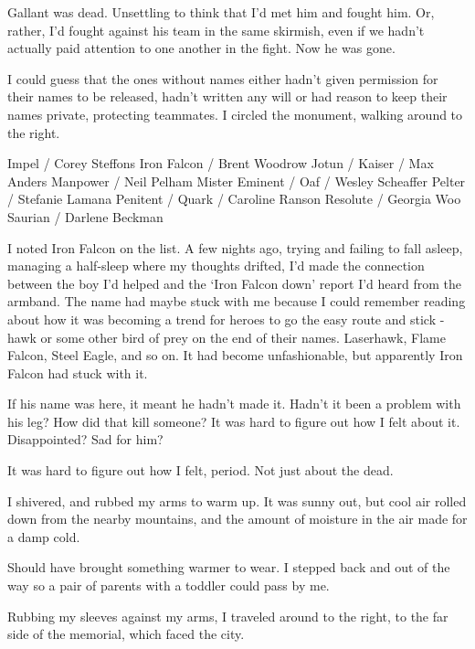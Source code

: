 Gallant was dead. Unsettling to think that I'd met him and fought him.   Or, rather, I'd fought against his team in the same skirmish, even if we hadn't actually paid attention to one another in the fight.  Now he was gone.



I could guess that the ones without names either hadn't given permission for their names to be released, hadn't written any will or had reason to keep their names private, protecting teammates.  I circled the monument, walking around to the right.



Impel / Corey Steffons
Iron Falcon / Brent Woodrow
Jotun /
Kaiser / Max Anders
Manpower / Neil Pelham
Mister Eminent /
Oaf / Wesley Scheaffer
Pelter / Stefanie Lamana
Penitent /
Quark / Caroline Ranson
Resolute / Georgia Woo
Saurian / Darlene Beckman



I noted Iron Falcon on the list.  A few nights ago, trying and failing to fall asleep, managing a half-sleep where my thoughts drifted, I'd made the connection between the boy I'd helped and the `Iron Falcon down' report I'd heard from the armband.  The name had maybe stuck with me because I could remember reading about how it was becoming a trend for heroes to go the easy route and stick -hawk or some other bird of prey on the end of their names.  Laserhawk, Flame Falcon, Steel Eagle, and so on.  It had become unfashionable, but apparently Iron Falcon had stuck with it.



If his name was here, it meant he hadn't made it.  Hadn't it been a problem with his leg?  How did that kill someone?  It was hard to figure out how I felt about it.  Disappointed?  Sad for him?



It was hard to figure out how I felt, period.  Not just about the dead.



I shivered, and rubbed my arms to warm up.  It was sunny out, but cool air rolled down from the nearby mountains, and the amount of moisture in the air made for a damp cold.



Should have brought something warmer to wear.  I stepped back and out of the way so a pair of parents with a toddler could pass by me.



Rubbing my sleeves against my arms, I traveled around to the right, to the far side of the memorial, which faced the city.



